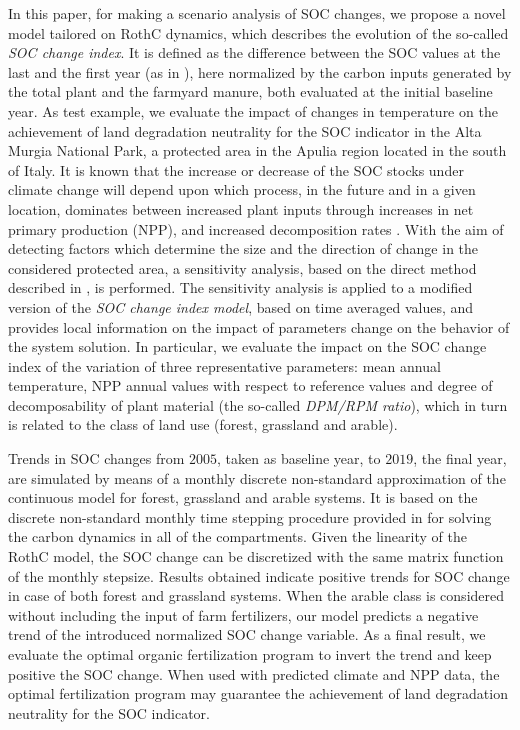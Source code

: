 \noindent In this paper, for making a scenario analysis of SOC changes, we propose a novel model tailored on RothC dynamics, which describes the 
evolution of the so-called  {\it SOC change index}. It is defined as the difference between the SOC values at the last  and the first year (as in \cite{morais2018proposal}), here normalized by  the carbon inputs generated by the total plant and the farmyard manure,  both evaluated at the initial baseline year. As test example,  we evaluate the impact of changes in temperature on the achievement  of land degradation neutrality for the  SOC indicator in the Alta Murgia National Park, a protected area in the Apulia region located in the south of Italy. It is known that the increase or decrease of the SOC stocks  under climate change will depend upon which process, in the future and in a given location,   dominates between increased plant inputs through increases in net primary production (NPP), and increased decomposition rates \cite{gottschalk2012will}. With the aim of detecting factors which determine the size and the direction of change  in the considered protected area,  %
a sensitivity analysis, based on the direct method described in  \cite{dickinson1976sensitivity}, is performed.
 The sensitivity analysis %
is applied to a modified version of the {\it SOC change index model}, based on time averaged values, and %
provides
 local information on the impact of parameters change on the behavior of the system solution. In particular, we %
evaluate the impact on  the SOC change index of the variation of  three representative  parameters: mean annual temperature,  NPP annual values with respect to  reference values and degree of decomposability of plant material (the so-called {\it DPM/RPM ratio}), which in turn is related to the class of land use (forest, grassland and arable).
 
 \noindent %
Trends in SOC changes from $2005$, taken as baseline year, to $2019$, the final year,
 are  simulated by means of a monthly discrete non-standard approximation of the continuous model for forest, grassland and arable systems. It is based on the discrete non-standard monthly time stepping procedure provided in \cite{diele2021non} for solving the carbon dynamics in all of the compartments. Given the linearity of the RothC model, the SOC change can be discretized with the same matrix function of the monthly stepsize. Results obtained indicate positive trends for SOC change in case of  both forest and grassland  systems.  
When the arable class is considered without including the input of farm fertilizers, our model predicts a  negative trend of the introduced normalized SOC change variable. As  a final result, we evaluate  the optimal organic fertilization program  to invert the trend and  keep positive the SOC change.  When used with predicted climate and NPP data, the optimal fertilization program may guarantee the achievement of land degradation neutrality for the SOC indicator. 

